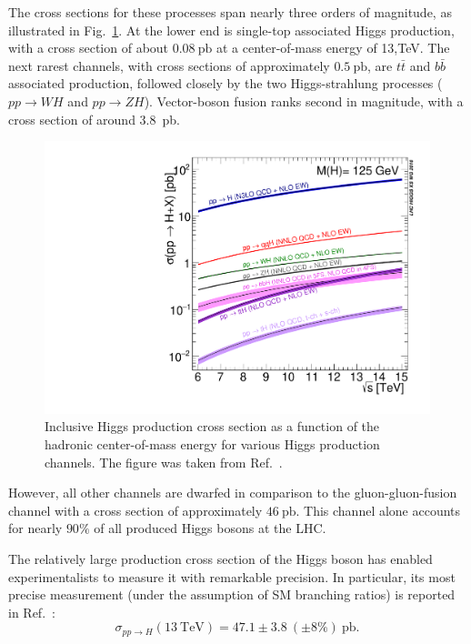 The cross sections for these processes span nearly three orders of magnitude, as illustrated in Fig.~\ref{fig:4:Escan}. At the lower end is single-top associated Higgs production, with a cross section of about $0.08\ \text{pb}$ at a center-of-mass energy of 13,TeV.  The next rarest channels, with cross sections of approximately $0.5\ \mathrm{pb}$, are $t \bar{t}$ and $b \bar{b}$ associated production, followed closely by the two Higgs-strahlung processes ($pp \rightarrow WH$ and $pp \rightarrow ZH$). Vector-boson fusion ranks second in magnitude, with a cross section of around 3.8~pb.
\begin{figure}[ht]
\centering
\includegraphics[scale=0.5]{Images/plot_Escan_H125_new_sqrt.pdf}
\caption{Inclusive Higgs production cross section as a function of the hadronic center-of-mass energy for various Higgs production channels. The figure was taken from Ref.~\cite{LHCHiggsCrossSectionWorkingGroup:2016ypw}.}
\label{fig:4:Escan}
\end{figure}

However, all other channels are dwarfed in comparison to the gluon-gluon-fusion channel with a cross section of approximately $46\ \mathrm{pb}$. This channel alone accounts for nearly $90\%$ of all produced Higgs bosons at the \acs{LHC}.

The relatively large production cross section of the Higgs boson has enabled experimentalists to measure it with remarkable precision. In particular, its most precise measurement (under the assumption of \acs{SM} branching ratios) is reported in Ref.~\cite{CMS:2022dwd}:
\begin{equation}
\sigma_{pp \rightarrow H}(13\ \mathrm{TeV}) = 47.1 \pm 3.8\ (\pm 8\%)\ \mathrm{pb}.
\label{eq:2:xSec_pp2H_experiment}
\end{equation}

